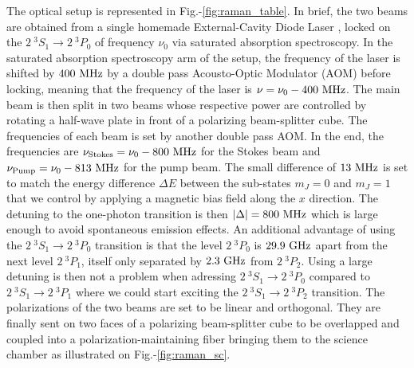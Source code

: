 The optical setup is represented in Fig.-\ref{fig:raman_table}. In brief, the two beams are obtained from a single homemade External-Cavity Diode Laser \cite{chao2019master}, locked on the $2 \ ^3 S_1 \rightarrow 2 \ ^3 P_0$ of frequency $\nu_0$ via saturated absorption spectroscopy. In the saturated absorption spectroscopy arm of the setup, the frequency of the laser is shifted by $400 \ \rm{MHz}$ by a double pass Acousto-Optic Modulator (AOM) before locking, meaning that the frequency of the laser is $\nu = \nu_0 - 400 \ \rm{MHz}$. The main beam is then split in two beams whose respective power are controlled by rotating a half-wave plate in front of a polarizing beam-splitter cube. The frequencies of each beam is set by another double pass AOM. In the end, the frequencies are $\nu_{\rm{Stokes}} = \nu_0 - 800 \ \rm{MHz}$ for the Stokes beam and $\nu_{\rm{Pump}} = \nu_0 - 813 \ \rm{MHz}$ for the pump beam. The small difference of $13 \ \rm{MHz}$ is set to match the energy difference $\Delta E$ between the sub-states $m_J=0$ and $m_J=1$ that we control by applying a magnetic bias field along the $x$ direction. The detuning to the one-photon transition is then $|\Delta|=800 \ \rm{MHz}$ which is large enough to avoid spontaneous emission effects. An additional advantage of using the $2 \ ^3 S_1 \rightarrow 2 \ ^3 P_0$ transition is that the level $2 \ ^3 P_0$ is $29.9 \ \rm{GHz}$ apart from the next level $2 \ ^3 P_1$, itself only separated by $2.3 \ \rm{GHz}$ from $2 \ ^3 P_2$. Using a large detuning is then not a problem when adressing $2 \ ^3 S_1 \rightarrow 2 \ ^3 P_0$ compared to $2 \ ^3 S_1 \rightarrow 2 \ ^3 P_1$ where we could start exciting the $2 \ ^3 S_1 \rightarrow 2 \ ^3 P_2$ transition.
The polarizations of the two beams are set to be linear and orthogonal. They are finally sent on two faces of a polarizing beam-splitter cube to be overlapped and coupled into a polarization-maintaining fiber bringing them to the science chamber as illustrated on Fig.-\ref{fig:raman_sc}.

